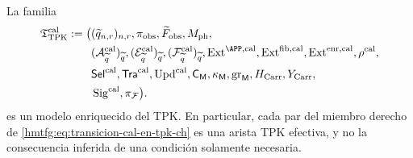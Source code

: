 \begin{proposition}
\label{hmtfg:prop:modelo-tpk-calibrado-ch}
La familia
\[
\begin{aligned}
 \mathfrak T_{\rm TPK}^{\rm cal}:=\bigl(
 &(\widetilde q_{n,r})_{n,r},\pi_{\rm obs},
   \widetilde F_{\rm obs},M_{\rm ph},\\
 &(\mathcal A_{\widetilde q}^{\rm cal})_{\widetilde q},
   (\mathcal E_{\widetilde q}^{\rm cal})_{\widetilde q},
   (\mathcal F_{\widetilde q}^{\rm cal})_{\widetilde q},
   \operatorname{Ext}^{\APP,\rm cal},
   \operatorname{Ext}^{\rm fib,cal},
   \operatorname{Ext}^{\rm enr,cal},\rho^{\rm cal},\\
 &\mathsf{Sel}^{\rm cal},\mathsf{Tra}^{\rm cal},
   \operatorname{Upd}^{\rm cal},\mathsf C_{\mathsf M},
   \kappa_{\mathsf M},\operatorname{gr}_{\mathsf M},
   H_{\rm Carr},Y_{\rm Carr},\\
 &\operatorname{Sig}^{\rm cal},\pi_{\mathcal F}\bigr).
\end{aligned}
\]
es un modelo enriquecido del TPK. En particular, cada par del miembro derecho
de \eqref{hmtfg:eq:transicion-cal-en-tpk-ch} es una arista TPK efectiva, y no la
consecuencia inferida de una condición solamente necesaria.
\end{proposition}

